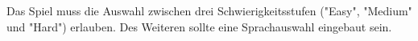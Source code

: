 Das Spiel \gls{muss} die Auswahl zwischen drei Schwierigkeitsstufen ("Easy", "Medium" und "Hard") erlauben.
Des Weiteren \gls{sollte} eine Sprachauswahl eingebaut sein.
